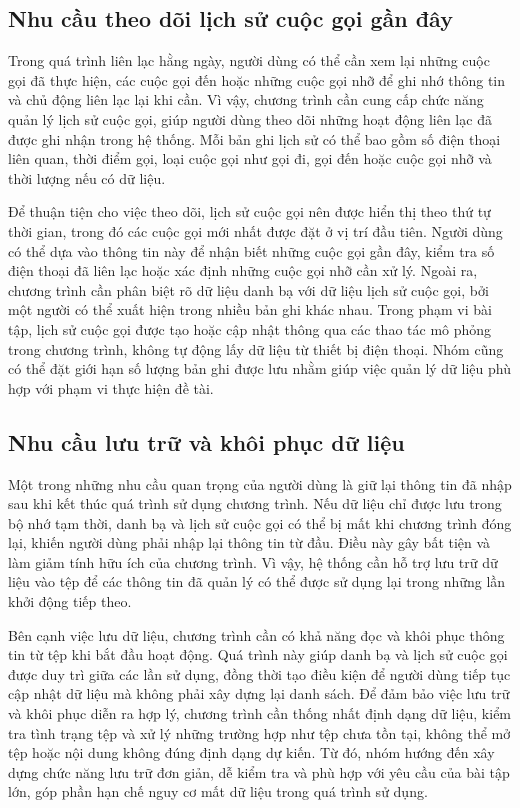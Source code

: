 \documentclass[12pt,a4paper]{report}
\begin{document}
\subsection{Nhu cầu theo dõi lịch sử cuộc gọi gần đây}

Trong quá trình liên lạc hằng ngày, người dùng có thể cần xem lại những cuộc gọi đã thực hiện, các cuộc gọi đến hoặc những cuộc gọi nhỡ để ghi nhớ thông tin và chủ động liên lạc lại khi cần. Vì vậy, chương trình cần cung cấp chức năng quản lý lịch sử cuộc gọi, giúp người dùng theo dõi những hoạt động liên lạc đã được ghi nhận trong hệ thống. Mỗi bản ghi lịch sử có thể bao gồm số điện thoại liên quan, thời điểm gọi, loại cuộc gọi như gọi đi, gọi đến hoặc cuộc gọi nhỡ và thời lượng nếu có dữ liệu.\par
Để thuận tiện cho việc theo dõi, lịch sử cuộc gọi nên được hiển thị theo thứ tự thời gian, trong đó các cuộc gọi mới nhất được đặt ở vị trí đầu tiên. Người dùng có thể dựa vào thông tin này để nhận biết những cuộc gọi gần đây, kiểm tra số điện thoại đã liên lạc hoặc xác định những cuộc gọi nhỡ cần xử lý. Ngoài ra, chương trình cần phân biệt rõ dữ liệu danh bạ với dữ liệu lịch sử cuộc gọi, bởi một người có thể xuất hiện trong nhiều bản ghi khác nhau. Trong phạm vi bài tập, lịch sử cuộc gọi được tạo hoặc cập nhật thông qua các thao tác mô phỏng trong chương trình, không tự động lấy dữ liệu từ thiết bị điện thoại. Nhóm cũng có thể đặt giới hạn số lượng bản ghi được lưu nhằm giúp việc quản lý dữ liệu phù hợp với phạm vi thực hiện đề tài.\par
\subsection{Nhu cầu lưu trữ và khôi phục dữ liệu}

Một trong những nhu cầu quan trọng của người dùng là giữ lại thông tin đã nhập sau khi kết thúc quá trình sử dụng chương trình. Nếu dữ liệu chỉ được lưu trong bộ nhớ tạm thời, danh bạ và lịch sử cuộc gọi có thể bị mất khi chương trình đóng lại, khiến người dùng phải nhập lại thông tin từ đầu. Điều này gây bất tiện và làm giảm tính hữu ích của chương trình. Vì vậy, hệ thống cần hỗ trợ lưu trữ dữ liệu vào tệp để các thông tin đã quản lý có thể được sử dụng lại trong những lần khởi động tiếp theo.\par
Bên cạnh việc lưu dữ liệu, chương trình cần có khả năng đọc và khôi phục thông tin từ tệp khi bắt đầu hoạt động. Quá trình này giúp danh bạ và lịch sử cuộc gọi được duy trì giữa các lần sử dụng, đồng thời tạo điều kiện để người dùng tiếp tục cập nhật dữ liệu mà không phải xây dựng lại danh sách. Để đảm bảo việc lưu trữ và khôi phục diễn ra hợp lý, chương trình cần thống nhất định dạng dữ liệu, kiểm tra tình trạng tệp và xử lý những trường hợp như tệp chưa tồn tại, không thể mở tệp hoặc nội dung không đúng định dạng dự kiến. Từ đó, nhóm hướng đến xây dựng chức năng lưu trữ đơn giản, dễ kiểm tra và phù hợp với yêu cầu của bài tập lớn, góp phần hạn chế nguy cơ mất dữ liệu trong quá trình sử dụng.\par
\end{document}
